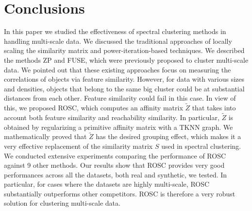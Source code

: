 \section{Conclusions}
In this paper we studied the effectiveness of spectral clustering methods in handling multi-scale data.
We discussed the traditional approaches of locally scaling the similarity matrix and power-iteration-based
techniques. We described the methods ZP and FUSE, which were previously proposed to cluster multi-scale
data. 
We pointed out that these existing approaches focus on measuring the correlations of objects via 
feature similarity. However, for data with various sizes and densities, objects that belong to the same
big cluster could be at substantial distances from each other. Feature similarity could fail in this case.
In view of this, we proposed ROSC, which computes an affinity matrix $\tilde{Z}$ that takes into account
both feature similarity and reachability similarity. In particular, $\tilde{Z}$ is obtained by regularizing 
a primitive affinity matrix with a TKNN graph. 
We mathematically proved that $\tilde{Z}$ has the desired grouping effect, which makes it a very 
effective replacement of the similarity matrix $S$ used in spectral clustering. 
We conducted extensive experiments comparing the performance of ROSC against 9 other methods.
Our results show that ROSC provides very good performances across all the datasets, both real and
synthetic, we tested. In particular, for cases where the datasets are highly multi-scale, ROSC 
substantially outperforms other competitors. 
ROSC is therefore a very robust solution for clustering multi-scale data.
\label{sec:conclusion}
